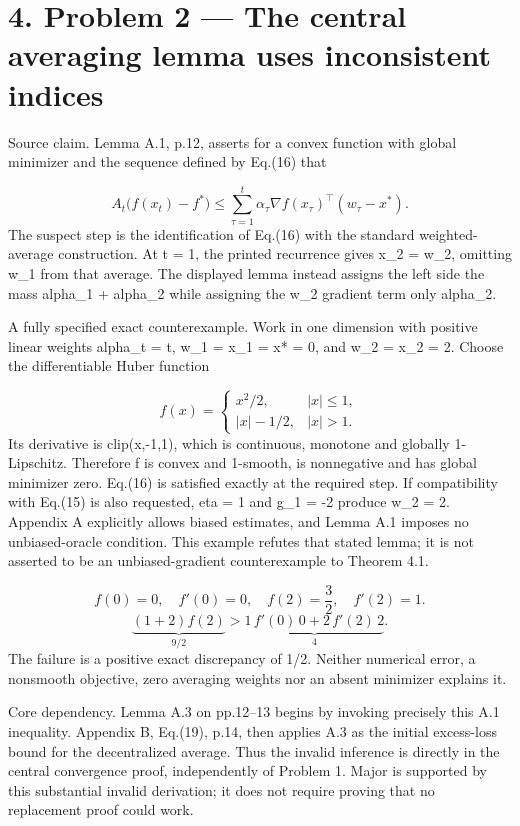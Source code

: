 \documentclass[10pt]{article}
\begin{document}
\section*{4. Problem 2 — The central averaging lemma uses inconsistent indices}
Source claim. Lemma A.1, p.12, asserts for a convex function with global minimizer and the sequence defined by Eq.(16) that\par
\[A_t\bigl(f(x_t)-f^*\bigr)
\le\sum_{\tau=1}^{t}\alpha_\tau
\nabla f(x_\tau)^\top(w_\tau-x^*).\] The suspect step is the identification of Eq.(16) with the standard weighted-average construction. At t = 1, the printed recurrence gives x\_2 = w\_2, omitting w\_1 from that average. The displayed lemma instead assigns the left side the mass alpha\_1 + alpha\_2 while assigning the w\_2 gradient term only alpha\_2.\par
A fully specified exact counterexample. Work in one dimension with positive linear weights alpha\_t = t, w\_1 = x\_1 = x* = 0, and w\_2 = x\_2 = 2. Choose the differentiable Huber function\par
\[f(x)=\begin{cases}x^2/2,&|x|\le1,\\ |x|-1/2,&|x|>1.\end{cases}\] Its derivative is clip(x,-1,1), which is continuous, monotone and globally 1-Lipschitz. Therefore f is convex and 1-smooth, is nonnegative and has global minimizer zero. Eq.(16) is satisfied exactly at the required step. If compatibility with Eq.(15) is also requested, eta = 1 and g\_1 = -2 produce w\_2 = 2. Appendix A explicitly allows biased estimates, and Lemma A.1 imposes no unbiased-oracle condition. This example refutes that stated lemma; it is not asserted to be an unbiased-gradient counterexample to Theorem 4.1.\par
\[f(0)=0,\quad f'(0)=0,\quad f(2)=\frac32,\quad f'(2)=1.\] \[\underbrace{(1+2)f(2)}_{9/2}
>\underbrace{1\,f'(0)\,0+2\,f'(2)\,2}_{4}.\] The failure is a positive exact discrepancy of 1/2. Neither numerical error, a nonsmooth objective, zero averaging weights nor an absent minimizer explains it.\par
Core dependency. Lemma A.3 on pp.12–13 begins by invoking precisely this A.1 inequality. Appendix B, Eq.(19), p.14, then applies A.3 as the initial excess-loss bound for the decentralized average. Thus the invalid inference is directly in the central convergence proof, independently of Problem 1. Major is supported by this substantial invalid derivation; it does not require proving that no replacement proof could work.\par
\end{document}

